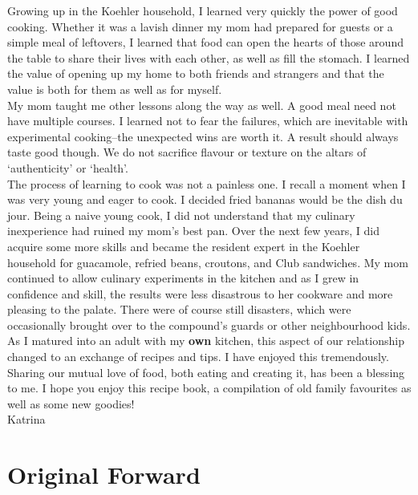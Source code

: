 \documentclass[11pt]{memoir} %
\begin{document}
Growing up in the Koehler household, I learned very quickly the power of good cooking. Whether it was a lavish dinner my mom had prepared for guests or a simple meal of leftovers, I learned that food can open the hearts of those around the table to share their lives with each other, as well as fill the stomach. I learned the value of opening up my home to both friends and strangers and that the value is both for them as well as for myself. \\[10pt]
My mom taught me other lessons along the way as well. A good meal need not have multiple courses. I learned not to fear the failures, which are inevitable with experimental cooking--the unexpected wins are worth it. A result should always taste good though. We do not sacrifice flavour or texture on the altars of `authenticity' or `health'. \\[10pt]
The process of learning to cook was not a painless one. I recall a moment when I was very young and eager to cook. I decided fried bananas would be the dish du jour. Being a naive young cook, I did not understand that my culinary inexperience had ruined my mom's best pan. Over the next few years, I did acquire some more skills and became the resident expert in the Koehler household for guacamole, refried beans, croutons, and Club sandwiches. My mom continued to allow culinary experiments in the kitchen and as I grew in confidence and skill, the results were less disastrous to her cookware and more pleasing to the palate. There were of course still disasters, which were occasionally brought over to the compound's guards or other neighbourhood kids. \\[10pt]
As I matured into an adult with my \textbf{own} kitchen, this aspect of our relationship changed to an exchange of recipes and tips. I have enjoyed this tremendously. Sharing our mutual love of food, both eating and creating it, has been a blessing to me. I hope you enjoy this recipe book, a compilation of old family favourites as well as some new goodies! \\[10pt]
\hspace{0.5\linewidth}Katrina

\chapter*{Original Forward} %
\end{document}
